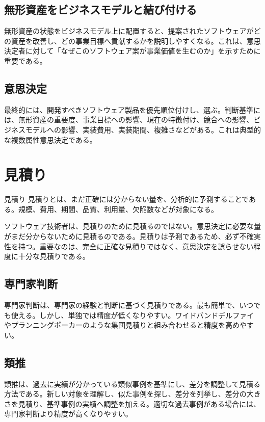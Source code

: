 \documentclass[a4paper,11pt]{article}
\begin{document}
\subsection{無形資産をビジネスモデルと結び付ける}

無形資産の状態をビジネスモデル上に配置すると、提案されたソフトウェアがどの資産を改善し、どの事業目標へ貢献するかを説明しやすくなる。これは、意思決定者に対して「なぜこのソフトウェア案が事業価値を生むのか」を示すために重要である。

\subsection{意思決定}

最終的には、開発すべきソフトウェア製品を優先順位付けし、選ぶ。判断基準には、無形資産の重要度、事業目標への影響、現在の特徴付け、競合への影響、ビジネスモデルへの影響、実装費用、実装期間、複雑さなどがある。これは典型的な複数属性意思決定である。

\section{見積り}

\begin{defbox}{見積り}
見積りとは、まだ正確には分からない量を、分析的に予測することである。規模、費用、期間、品質、利用量、欠陥数などが対象になる。
\end{defbox}

ソフトウェア技術者は、見積りのために見積るのではない。意思決定に必要な量がまだ分からないために見積るのである。見積りは予測であるため、必ず不確実性を持つ。重要なのは、完全に正確な見積りではなく、意思決定を誤らせない程度に十分な見積りである。

\subsection{専門家判断}

専門家判断は、専門家の経験と判断に基づく見積りである。最も簡単で、いつでも使える。しかし、単独では精度が低くなりやすい。ワイドバンドデルファイやプランニングポーカーのような集団見積りと組み合わせると精度を高めやすい。

\subsection{類推}

類推は、過去に実績が分かっている類似事例を基準にし、差分を調整して見積る方法である。新しい対象を理解し、似た事例を探し、差分を列挙し、差分の大きさを見積り、基準事例の実績へ調整を加える。適切な過去事例がある場合には、専門家判断より精度が高くなりやすい。
\end{document}
